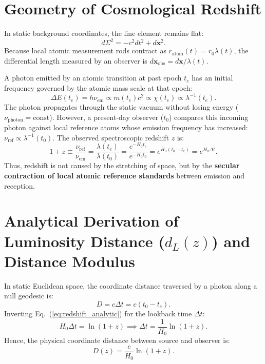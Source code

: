 \documentclass[11pt,a4paper]{article}
\begin{document}
\section{Geometry of Cosmological Redshift}
\label{sec:redshift_geometry}

In static background coordinates, the line element remains flat:
\begin{equation}
    d\Sigma^2 = -c^2 dt^2 + d\mathbf{x}^2.
    \label{eq:static_line_element}
\end{equation}
Because local atomic measurement rods contract as $r_{\mathrm{atom}}(t) = r_0 \lambda(t)$, the differential length measured by an observer is $d\mathbf{x}_{\mathrm{obs}} = d\mathbf{x} / \lambda(t)$.

A photon emitted by an atomic transition at past epoch $t_e$ has an initial frequency governed by the atomic mass scale at that epoch:
\begin{equation}
    \Delta E(t_e) = h \nu_{\mathrm{em}} \propto m(t_e) c^2 \propto \chi(t_e) \propto \lambda^{-1}(t_e).
\end{equation}
The photon propagates through the static vacuum without losing energy ($\nu_{\mathrm{photon}} = \text{const}$). However, a present-day observer ($t_0$) compares this incoming photon against local reference atoms whose emission frequency has increased: $\nu_{\mathrm{ref}} \propto \lambda^{-1}(t_0)$. The observed spectroscopic redshift $z$ is:
\begin{equation}
    1 + z \equiv \frac{\nu_{\mathrm{ref}}}{\nu_{\mathrm{em}}} = \frac{\lambda(t_e)}{\lambda(t_0)} = \frac{e^{-H_0 t_e}}{e^{-H_0 t_0}} = e^{H_0 (t_0 - t_e)} = e^{H_0 \Delta t}.
    \label{eq:redshift_analytic}
\end{equation}
Thus, redshift is not caused by the stretching of space, but by the \textbf{secular contraction of local atomic reference standards} between emission and reception.

\section{Analytical Derivation of Luminosity Distance (\texorpdfstring{$d_L(z)$}{dL(z)}) and Distance Modulus}
\label{sec:dl_derivation}

In static Euclidean space, the coordinate distance traversed by a photon along a null geodesic is:
\begin{equation}
    D = c \Delta t = c (t_0 - t_e).
\end{equation}
Inverting Eq.~(\ref{eq:redshift_analytic}) for the lookback time $\Delta t$:
\begin{equation}
    H_0 \Delta t = \ln(1 + z) \implies \Delta t = \frac{1}{H_0} \ln(1 + z).
\end{equation}
Hence, the physical coordinate distance between source and observer is:
\begin{equation}
    D(z) = \frac{c}{H_0} \ln(1 + z).
    \label{eq:coord_dist}
\end{equation}
\end{document}
